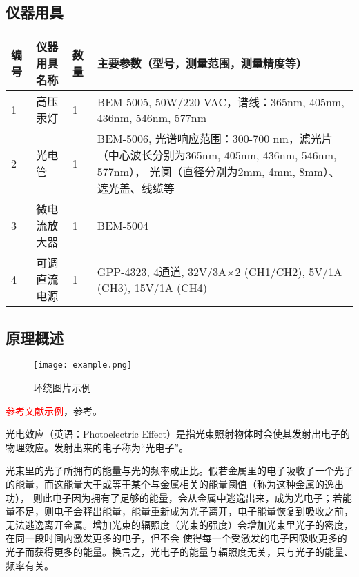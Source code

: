 \documentclass[dvipsnames, svgnames,a4paper,11pt]{article}
\begin{document}
\subsection{仪器用具}
\begin{table}[htbp]
	\centering
	\renewcommand\arraystretch{1.6}
	\begin{tabular}{p{}|p{}|p{}|p{}}
	\hline
	编号& 仪器用具名称 & 数量 &  主要参数（型号，测量范围，测量精度等） \\
	\hline
	1&高压汞灯 &1 & BEM-5005, 50W/220 VAC，谱线：365nm, 405nm, 436nm, 546nm, 577nm\\

	2&光电管 &1 & BEM-5006, 光谱响应范围：300-700 nm，滤光片（中心波长分别为365nm, 405nm, 436nm, 546nm, 577nm），
	光阑（直径分别为2mm, 4mm, 8mm）、遮光盖、线缆等 \\
	
	3&微电流放大器 & 1 &BEM-5004 \\
	
	4&可调直流电源&1 & GPP-4323, 4通道, 32V/3A$\times$2 (CH1/CH2), 5V/1A (CH3), 15V/1A (CH4)\\
	\hline
\end{tabular}
\end{table}

\subsection{原理概述}
\begin{wrapfigure}{l}{0cm} %
	\centering
	\texttt{[image: example.png]}
	\caption{环绕图片示例}
\end{wrapfigure}
\textcolor{red}{参考文献示例}，参考\cite{test1,test2}。

光电效应（英语：Photoelectric Effect）是指光束照射物体时会使其发射出电子的物理效应。发射出来的电子称为“光电子”。

光束里的光子所拥有的能量与光的频率成正比。假若金属里的电子吸收了一个光子的能量，而这能量大于或等于某个与金属相关的能量阈值（称为这种金属的逸出功），
则此电子因为拥有了足够的能量，会从金属中逃逸出来，成为光电子；若能量不足，则电子会释出能量，能量重新成为光子离开，电子能量恢复到吸收之前，
无法逃逸离开金属。增加光束的辐照度（光束的强度）会增加光束里光子的密度，在同一段时间内激发更多的电子，但不会
使得每一个受激发的电子因吸收更多的光子而获得更多的能量。换言之，光电子的能量与辐照度无关，只与光子的能量、频率有关。
\end{document}
